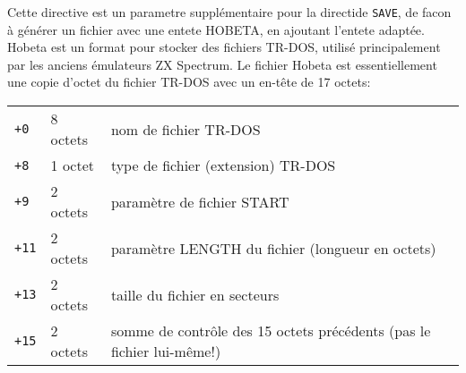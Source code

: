 \begin{xfr}
Cette directive est un parametre supplémentaire pour la directide \texttt{SAVE}, de facon à générer un fichier avec une entete HOBETA, en ajoutant l'entete adaptée.
Hobeta est un format pour stocker des fichiers TR-DOS, utilisé principalement par les anciens émulateurs ZX Spectrum. Le fichier Hobeta est essentiellement une copie d'octet du fichier TR-DOS avec un en-tête de 17 octets:


\medskip

\begin{tabular}{l|l|l}
\texttt{+0}  & 8 octets & nom de fichier TR-DOS \\
\texttt{+8 } & 1 octet  & type de fichier (extension) TR-DOS \\
\texttt{+9 } & 2 octets & paramètre de fichier START \\
\texttt{+11} & 2 octets & paramètre LENGTH du fichier (longueur en octets) \\
\texttt{+13} & 2 octets & taille du fichier en secteurs \\
\texttt{+15} & 2 octets & somme de contrôle des 15 octets précédents (pas le fichier lui-même!) \\
\end{tabular}





\end{xfr}

